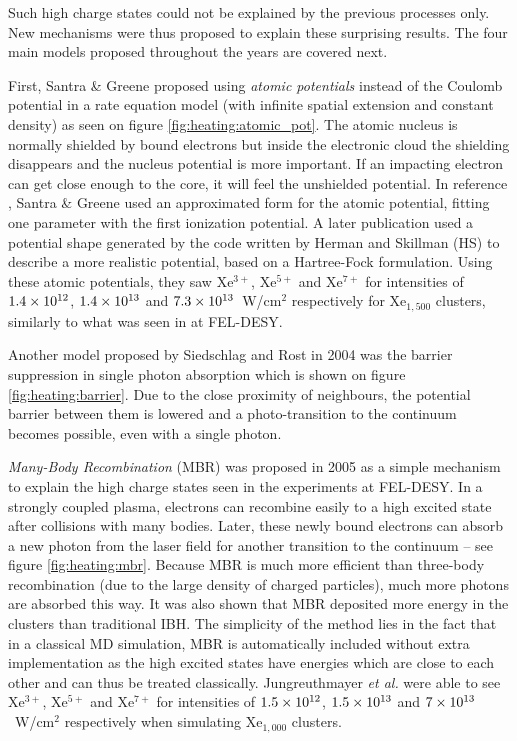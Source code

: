 Such high charge states could not be explained by the previous processes only.
New mechanisms were thus proposed to explain these surprising results.
The four main models proposed throughout the years are covered next.



First, Santra \& Greene proposed using \textit{atomic potentials} instead of
the Coulomb potential in a rate equation model (with infinite spatial
extension and
constant density) as seen on figure \ref{fig:heating:atomic_pot}.
The atomic nucleus is normally shielded by bound electrons but inside the
electronic cloud the shielding disappears and the nucleus potential is more
important. If an impacting electron can get close enough to the core, it will
feel the unshielded potential.
In reference \cite{Greene2003}, Santra \& Greene used an approximated form for
the atomic potential, fitting one parameter with the first ionization potential.
A later\cite{Walters2006} publication used a
potential shape generated by the code written by Herman and
Skillman\cite{HS1963} (HS) to describe a more realistic
potential, based on a
Hartree-Fock formulation. Using these atomic potentials, they saw Xe$^{3+}$,
Xe$^{5+}$ and Xe$^{7+}$ for intensities of $\ten{1.4}{12}$, $\ten{1.4}{13}$ and
$\ten{7.3}{13}$~W/cm$^2$ respectively for Xe$_{1,500}$ clusters, similarly to
what was seen in at FEL-DESY.



Another model proposed by Siedschlag and Rost\cite{Siedschlag2004} in 2004 was
the barrier suppression in single photon absorption which is shown on figure
\ref{fig:heating:barrier}. Due to the close proximity
of neighbours, the potential barrier between them is lowered and
a photo-transition to the continuum becomes possible, even with a single photon.



\textit{Many-Body Recombination} (MBR) was proposed in 2005\cite{Jungreuthmayer2005}
as a simple mechanism to explain the high charge states seen in the
experiments at FEL-DESY. In a strongly coupled plasma, electrons can recombine
easily to a high excited
state after collisions with many bodies. Later, these newly bound electrons can
absorb a new photon from the laser field for another transition to the
continuum -- see figure \ref{fig:heating:mbr}.
Because MBR is much more efficient than three-body
recombination (due to the large density of charged particles), much more
photons are absorbed this way. It was also shown that MBR deposited more energy
in the clusters than traditional IBH.
The simplicity of the
method lies in the fact that in a classical MD simulation, MBR is automatically
included without extra implementation as the high excited states have energies
which are close to each other and can thus be treated classically.
Jungreuthmayer \textit{et al.} were able
to see Xe$^{3+}$, Xe$^{5+}$ and Xe$^{7+}$ for intensities of $\ten{1.5}{12}$,
$\ten{1.5}{13}$ and $\ten{7}{13}$~W/cm$^2$ respectively when simulating
Xe$_{1,000}$ clusters.

